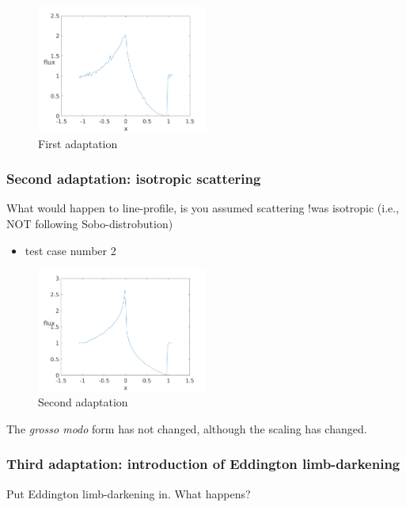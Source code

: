 \documentclass[../main/main.tex]{subfiles}
\begin{document}
\begin{figure}[!htbp]
\centering
\includegraphics[width=0.5\textwidth]{../../introductory_exercises/P_Cygni_profile_UV_resonance/npot6xk0100alpha0beta1test1.png}
\caption{First adaptation}
\label{PCyg_mu=1}
\end{figure}

\newpage
\subsubsection{Second adaptation: isotropic scattering}
What would happen to line-profile, is you assumed scattering
!was isotropic (i.e., NOT following Sobo-distrobution)
\begin{itemize}
\item test case number 2
\end{itemize}

\begin{figure}[!htp]
\centering
\includegraphics[width=0.5\textwidth]{../../introductory_exercises/P_Cygni_profile_UV_resonance/npot6xk0100alpha0beta1test2.png}
\caption{Second adaptation}
\end{figure}

The \textit{grosso modo} form has not changed, although the scaling has changed.

\newpage
\subsubsection{Third adaptation: introduction of Eddington limb-darkening}
Put Eddington limb-darkening in. What happens? 
\end{document}
